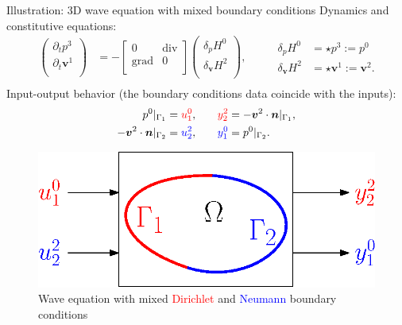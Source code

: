 \documentclass[aspectratio=169]{beamer}
\DeclareMathOperator*{\grad}{grad}
\renewcommand{\div}{\operatorname{div}}
\begin{document}
\begin{frame}{Illustration: 3D wave equation with mixed boundary conditions}
	Dynamics and constitutive equations:
\begin{equation*}
	\begin{aligned}
		\begin{pmatrix}
			\partial_t p^3 \\
			\partial_t \bm{v}^1\\
		\end{pmatrix} &= 
		-\begin{bmatrix}
			0 & \div \\
			\grad & 0 \\
		\end{bmatrix}
		\begin{pmatrix}
			\delta_{p} H^{0}\\
			\delta_{\bm{v}} H^{2}\\
		\end{pmatrix}, \\
	\end{aligned}	\qquad
\begin{aligned}
	\delta_{p} H^{0} &= \star p^3 := p^0\\
	\delta_{\bm{v}} H^{2} &= \star \bm{v}^1:= \bm{v}^2. \\
\end{aligned}
\end{equation*}
Input-output behavior (the boundary conditions data coincide with the inputs):
\begin{equation*}
	\begin{aligned}
		p^0|_{\Gamma_1} &= \textcolor{red}{u^0_1}, \\
	-\bm{v}^2\cdot \bm{n}|_{\Gamma_2}  &= \textcolor{blue}{u^{2}_2}, \\
	\end{aligned}	\qquad
	\begin{aligned}
		\textcolor{red}{y^2_2} &= -\bm{v}^2\cdot \bm{n}|_{\Gamma_1}, \\
		\textcolor{blue}{y^{0}_1} &= p^0|_{\Gamma_2}.
	\end{aligned}
\end{equation*}

\begin{figure}
\centering
\includegraphics[width=.5\textwidth]{bound_part.eps}
\caption*{Wave equation with mixed \textcolor{red}{Dirichlet} and \textcolor{blue}{Neumann} boundary conditions}
\end{figure}

\end{frame}	
\end{document}
